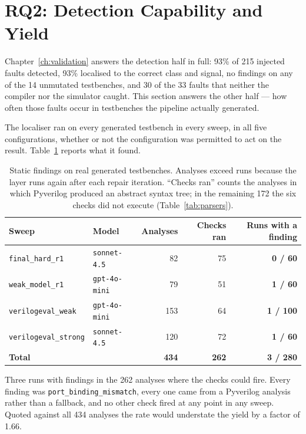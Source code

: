 \documentclass[11pt,a4paper,titlepage=false]{scrreprt}
\begin{document}
\section{RQ2: Detection Capability and Yield}\label{sec:res-rq2b}

Chapter~\ref{ch:validation} answers the detection half in full: 93\% of 215 injected faults
detected, 93\% localised to the correct class and signal, no findings on any of the 14
unmutated testbenches, and 30 of the 33 faults that neither the compiler nor the simulator
caught. This section answers the other half --- how often those faults occur in testbenches
the pipeline actually generated.

The localiser ran on every generated testbench in every sweep, in all five configurations,
whether or not the configuration was permitted to act on the result.
Table~\ref{tab:yield} reports what it found.

\begin{table}[H]
\centering
\small
\begin{tabular}{@{}l l r r r@{}}
\toprule
\textbf{Sweep} & \textbf{Model} & \textbf{Analyses} & \textbf{Checks ran} & \textbf{Runs with a finding} \\
\midrule
\texttt{final\_hard\_r1}     & \texttt{sonnet-4.5}  & 82  & 75  & \textbf{0 / 60} \\
\texttt{weak\_model\_r1}     & \texttt{gpt-4o-mini} & 79  & 51  & \textbf{1 / 60} \\
\texttt{verilogeval\_weak}   & \texttt{gpt-4o-mini} & 153 & 64  & \textbf{1 / 100} \\
\texttt{verilogeval\_strong} & \texttt{sonnet-4.5}  & 120 & 72  & \textbf{1 / 60} \\
\midrule
\textbf{Total}               &                      & \textbf{434} & \textbf{262} & \textbf{3 / 280} \\
\bottomrule
\end{tabular}
\caption{Static findings on real generated testbenches. Analyses exceed runs because the
layer runs again after each repair iteration. ``Checks ran'' counts the analyses in which
Pyverilog produced an abstract syntax tree; in the remaining 172 the six checks did not
execute (Table~\ref{tab:parsers}).}
\label{tab:yield}
\end{table}

Three runs with findings in the 262 analyses where the checks could fire. Every finding was
\texttt{port\_binding\_mismatch}, every one came from a Pyverilog analysis rather than a
fallback, and no other check fired at any point in any sweep. Quoted against all 434 analyses
the rate would understate the yield by a factor of 1.66.
\end{document}
